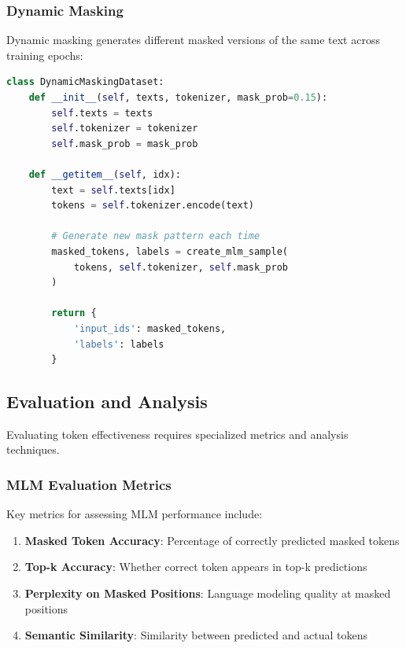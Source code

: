 \subsubsection{Dynamic Masking}

Dynamic masking generates different masked versions of the same text across training epochs:

\begin{lstlisting}[language=Python, caption=Dynamic masking implementation]
class DynamicMaskingDataset:
    def __init__(self, texts, tokenizer, mask_prob=0.15):
        self.texts = texts
        self.tokenizer = tokenizer
        self.mask_prob = mask_prob
    
    def __getitem__(self, idx):
        text = self.texts[idx]
        tokens = self.tokenizer.encode(text)
        
        # Generate new mask pattern each time
        masked_tokens, labels = create_mlm_sample(
            tokens, self.tokenizer, self.mask_prob
        )
        
        return {
            'input_ids': masked_tokens,
            'labels': labels
        }
\end{lstlisting}

\subsection{Evaluation and Analysis}

Evaluating \mask{} token effectiveness requires specialized metrics and analysis techniques.

\subsubsection{MLM Evaluation Metrics}

Key metrics for assessing MLM performance include:

\begin{enumerate}
\item \textbf{Masked Token Accuracy}: Percentage of correctly predicted masked tokens
\item \textbf{Top-k Accuracy}: Whether correct token appears in top-k predictions
\item \textbf{Perplexity on Masked Positions}: Language modeling quality at masked positions
\item \textbf{Semantic Similarity}: Similarity between predicted and actual tokens
\end{enumerate}


